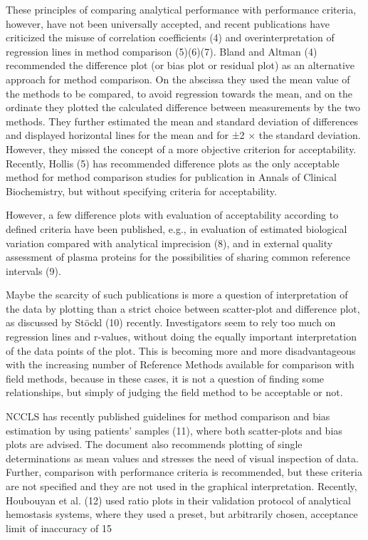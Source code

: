 \documentclass[12pt, a4paper]{report}
\theoremstyle{plain}
\theoremstyle{definition}
\theoremstyle{remark}
\begin{document}
These principles of comparing analytical performance with performance criteria, however, have not been universally accepted, and recent publications have criticized the misuse of correlation coefficients (4) and overinterpretation of regression lines in method comparison (5)(6)(7). Bland and Altman (4) recommended the difference plot (or bias plot or residual plot) as an alternative approach for method comparison. On the abscissa they used the mean value of the methods to be compared, to avoid regression towards the mean, and on the ordinate they plotted the calculated difference between measurements by the two methods. They further estimated the mean and standard deviation of differences and displayed horizontal lines for the mean and for ±2 × the standard deviation. However, they missed the concept of a more objective criterion for acceptability. Recently, Hollis (5) has recommended difference plots as the only acceptable method for method comparison studies for publication in Annals of Clinical Biochemistry, but without specifying criteria for acceptability.

However, a few difference plots with evaluation of acceptability according to defined criteria have been published, e.g., in evaluation of estimated biological variation compared with analytical imprecision (8), and in external quality assessment of plasma proteins for the possibilities of sharing common reference intervals (9).

Maybe the scarcity of such publications is more a question of interpretation of the data by plotting than a strict choice between scatter-plot and difference plot, as discussed by Stöckl (10) recently. Investigators seem to rely too much on regression lines and r-values, without doing the equally important interpretation of the data points of the plot. This is becoming more and more disadvantageous with the increasing number of Reference Methods available for comparison with field methods, because in these cases, it is not a question of finding some relationships, but simply of judging the field method to be acceptable or not.

NCCLS has recently published guidelines for method comparison and bias estimation by using patients’ samples (11), where both scatter-plots and bias plots are advised. The document also recommends plotting of single determinations as mean values and stresses the need of visual inspection of data. Further, comparison with performance criteria is recommended, but these criteria are not specified and they are not used in the graphical interpretation. Recently, Houbouyan et al. (12) used ratio plots in their validation protocol of analytical hemostasis systems, where they used a preset, but arbitrarily chosen, acceptance limit of inaccuracy of 15%
\end{document}
